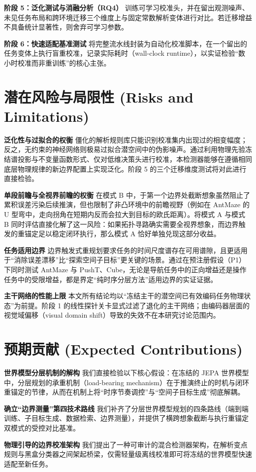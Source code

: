\documentclass[11pt]{article}
\begin{document}
\textbf{阶段 5：泛化测试与消融分析（RQ4）} 训练可学习校准头，并在留出观测噪声、未见任务布局和跨环境迁移三个维度上与固定常数解析变体进行对比。若迁移增益不具备统计显著性，则舍弃可学习参数。

\textbf{阶段 6：快速适配基准测试} 将完整流水线封装为自动化校准脚本，在一个留出的任务变体上执行盲重校准，记录实际耗时（wall-clock runtime），以实证检验“数小时校准而非重训练”的核心主张。

\section{潜在风险与局限性 (Risks and Limitations)}

\textbf{泛化性与过拟合的权衡} 僵化的解析规则库只能识别校准集内出现过的相变幅度；反之，无约束的神经网络则极易过拟合潜空间中的伪影噪声。通过利用物理先验冻结谱投影与不变量函数形式、仅对低维决策头进行校准，本检测器能够在遵循相同底层物理规律的新边界配置上实现泛化。阶段 5 的三个迁移维度测试将对此进行直接检验。

\textbf{单段前瞻与全视界前瞻的权衡} 在模式 B 中，于第一个边界处截断想象虽然阻止了累积误差污染后续推演，但也限制了非凸环境中的前瞻视野（例如在 AntMaze 的 U 型弯中，走向拐角在短期内反而会拉大到目标的欧氏距离）。将模式 A 与模式 B 同时评估直接化解了这一风险：如果拓扑寻路确实需要全视界想象，而边界触发的重锚定足以稳定闭环执行，那么模式 A 恰好单独兑现这部分收益。

\textbf{任务适用边界} 边界触发式重规划要求任务的时间尺度谱存在可用谱隙，且更适用于“消除误差漂移”比“探索空间子目标”更关键的场景。通过在预注册假设（P1）下同时测试 AntMaze 与 PushT、Cube，无论是导航任务中的正向增益还是操作任务中的受限增益，都是界定“纯时序分层方法”适用边界的实证证据。

\textbf{主干网络的性能上限} 本文所有结论均以“冻结主干的潜空间已有效编码任务物理状态”为前提。阶段 1 的线性探针关卡显式过滤了退化的主干网络；由编码器层面的视觉域偏移（visual domain shift）导致的失效不在本研究讨论范围内。

\section{预期贡献 (Expected Contributions)}

\textbf{世界模型分层机制的解构} 我们直接检验以下核心假设：在冻结的 JEPA 世界模型中，分层规划的承重机制（load-bearing mechanism）在于推演终止的时机与闭环重锚定的节律，从而在机制上将“时序节奏调控”与“空间子目标生成”彻底解耦。

\textbf{确立“边界测量”第四技术路线} 我们补齐了分层世界模型规划的四条路线（端到端训练、子目标生成、数据检索、边界测量），并提供了横跨想象截断与执行重锚定双模式的受控对比基准。

\textbf{物理引导的边界校准架构} 我们提出了一种可审计的混合检测器架构，在解析变点规则与黑盒分类器之间架起桥梁，仅需轻量级离线校准即可将冻结的世界模型快速适配至新任务。



\end{document}
